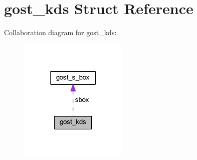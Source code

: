 \hypertarget{structgost__kds}{}\section{gost\+\_\+kds Struct Reference}
\label{structgost__kds}


Collaboration diagram for gost\+\_\+kds\+:
\nopagebreak
\begin{figure}[H]
\begin{center}
\leavevmode
\includegraphics[width=147pt]{structgost__kds__coll__graph}
\end{center}
\end{figure}
